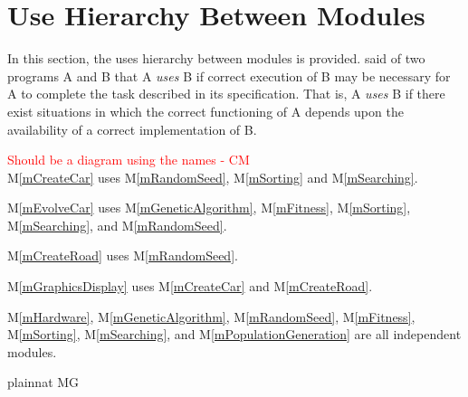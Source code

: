 \documentclass[12pt, titlepage]{article}
\newcommand{\mref}[1]{M\ref{#1}}
\begin{document}
\section{Use Hierarchy Between Modules} \label{SecUse}

In this section, the uses hierarchy between modules is
provided. \citet{Parnas1978} said of two programs A and B that A {\em uses} B if
correct execution of B may be necessary for A to complete the task described in
its specification. That is, A {\em uses} B if there exist situations in which
the correct functioning of A depends upon the availability of a correct
implementation of B.  

\textcolor{red}{Should be a diagram using the names - CM} \\
\mref{mCreateCar} uses \mref{mRandomSeed}, \mref{mSorting} and  
\mref{mSearching}.

\mref{mEvolveCar} uses \mref{mGeneticAlgorithm}, \mref{mFitness}, 
\mref{mSorting}, \mref{mSearching}, and \mref{mRandomSeed}.

\mref{mCreateRoad} uses \mref{mRandomSeed}.

\mref{mGraphicsDisplay} uses \mref{mCreateCar} and \mref{mCreateRoad}.

\mref{mHardware}, \mref{mGeneticAlgorithm}, \mref{mRandomSeed}, \mref{mFitness}, 
\mref{mSorting},  \mref{mSearching}, and \mref{mPopulationGeneration} are all 
independent modules.

 {plainnat}
 {MG}
\end{document}
